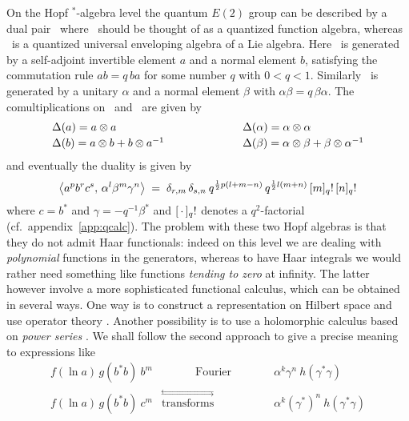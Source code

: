 On the Hopf $^*$-algebra level the quantum $E(2)$ group can be described by a
dual pair \UqAq\ where \Aq\ should be thought of as a quantized function algebra,
whereas \Uq\ is a quantized universal enveloping algebra of a Lie algebra.
Here \Uq\ is generated by a self-adjoint invertible element $a$ and a normal
element $b$, satisfying the commutation rule $ab = q \,ba$ for some number $q$ with $0<q<1$.
Similarly \Aq\ is generated by a unitary $\alpha$ and a normal element $\beta$
with $\alpha\beta = q\,\beta\alpha$.
The comultiplications on \Uq\ and \Aq\ are given by
$$ \begin{array}{lcl}
   \Delta(a) = a \tens a
&\hspace{5em}&
   \Delta(\alpha) = \alpha \tens \alpha
\\
   \Delta(b) = a \tens b + b \tens a^{-1}
&&
   \Delta(\beta) = \alpha \tens \beta + \beta \tens \alpha^{-1}
   \vertL
\end{array} $$
and eventually the duality is given by
$$  \pairM{a^p b^r c^s}{\alpha^l \beta^m \gamma^n}
        \;=\;
    \delta_{r,m}\,  \delta_{s,n} \: q^{\frac{1}{2}p(l+m-n)} \,
                         q^{\frac{1}{2}l(m+n)} \,\qfac{m}\, \qfac{n} $$
where $c=b^*$ and $\gamma=-q^{-1}\beta^*$ and $[\,\cdot\,]_q!$ denotes a $q^2$-factorial
(cf.\ \mbox{appendix \ref{app:qcalc}}).
The problem with these two Hopf algebras is that they do not admit Haar functionals:
indeed on this level we are dealing with {\em polynomial\/} functions in the generators,
whereas to have Haar integrals we would rather need something
like functions {\em tending to zero\/} at infinity. The latter however involve a more
sophisticated functional calculus, which can be obtained in several ways.
One way is to construct a representation on Hilbert space and use operator theory
\cite{Fons:spectral_conditions,FonsWor:QE2,Wor:QE2,Wor:Affiliated,Wor:operatoreq}\@.
Another possibility is to use a holomorphic calculus based on {\em power series}
\cite{Koelink:thesis,Koelink:QE2}\@.
We shall follow the second approach to give a precise meaning to expressions like
$$ \begin{array}{lcr}
    f(\ln a)\, g(b^* b)\: b^m  &  \hspace{3em} \mbox{Fourier} \hspace{3em}&
       \alpha^k  \gamma^n \:  h(\gamma^*\gamma) \\
    f(\ln a)\, g(b^* b)\: c^m  &
      \stackrel{\displaystyle \leftrightarrows}{\mbox{transforms}} &
           \alpha^k  (\gamma^*)^n  \: h(\gamma^*\gamma)
   \end{array}$$
